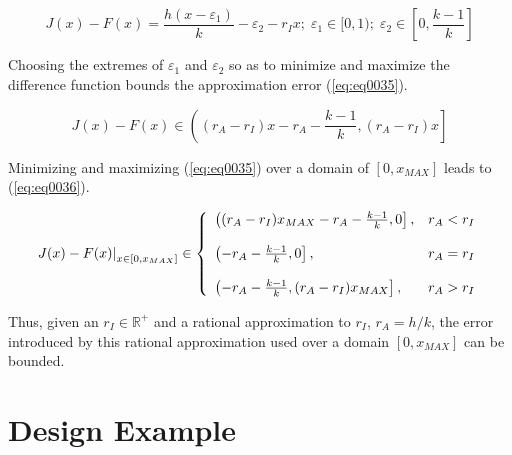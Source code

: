 \documentclass{esub2acm}
\newcommand{\realsetnonneg}{{\mathbb{R}^+}}
\begin{document}
\begin{equation}
\label{eq:eq0032}
J(x) - F(x) = \frac{{h(x - \varepsilon _1 ) }}{k} - \varepsilon _2  - r_I x
; \;
\varepsilon _1  \in [0,1)
; \;
\varepsilon _2  \in \left[ {0,\frac{{k - 1}}{k}} \right]
\end{equation}

Choosing the extremes of
$\varepsilon_{1}$ and $\varepsilon_{2}$
so as to minimize and maximize the difference
function bounds the approximation error (\ref{eq:eq0035}).

\begin{equation}
\label{eq:eq0035}
  J(x) - F(x) \in
  \left( {(r_A  - r_I )x - r_A  - \frac{{k - 1}}{k},(r_A  - r_I )x } \right]
\end{equation}

Minimizing and maximizing (\ref{eq:eq0035}) over
a domain of $[0,x_{MAX}]$ leads to (\ref{eq:eq0036}).

\begin{equation}
\label{eq:eq0036}
  \left. {J(x) - F(x)} \right|_{x \in [0,x_{MAX} ]}  \in
  \left\{ {\begin{array}{*{20}c}
   {\left( {(r_A  - r_I )x_{MAX}  - r_A  - \frac{{k - 1}}{k},0} \right],}
    \hfill & {r_A  < r_I } \hfill  \\
   \\
   {\left( { - r_A  - \frac{{k - 1}}{k},0} \right],} \hfill & {r_A  = r_I } \hfill  \\
   \\
   {\left( { - r_A  - \frac{{k - 1}}{k},(r_A  - r_I )x_{MAX} } \right] ,}
    \hfill & {r_A  > r_I } \hfill  \\
\end{array}} \right.
\end{equation}

Thus, given an $r_I \in \realsetnonneg$ and a rational approximation to $r_I$,
$r_A = h/k$, the error introduced by this rational approximation used over a
domain $[0,x_{MAX}]$ can be bounded.


\section{Design Example}
\label{sec:designexample}
\end{document}
